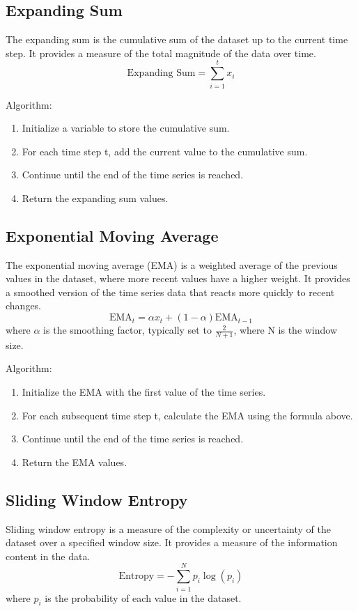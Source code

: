 \subsection{Expanding Sum}
The expanding sum is the cumulative sum of the dataset up to the current time step. It provides a measure of the total magnitude of the data over time.
\begin{equation}
    \text{Expanding Sum} = \sum_{i=1}^{t} x_i
    \label{eq:expanding_sum}
\end{equation}

Algorithm:
\begin{enumerate}
    \item Initialize a variable to store the cumulative sum.
    \item For each time step t, add the current value to the cumulative sum.
    \item Continue until the end of the time series is reached.
    \item Return the expanding sum values.
\end{enumerate}

\subsection{Exponential Moving Average}
The exponential moving average (EMA) is a weighted average of the previous values in the dataset, where more recent values have a higher weight. It provides a smoothed version of the time series data that reacts more quickly to recent changes.
\begin{equation}
    \text{EMA}_t = \alpha x_t + (1 - \alpha) \text{EMA}_{t-1}
    \label{eq:ema}
\end{equation}
where $\alpha$ is the smoothing factor, typically set to $\frac{2}{N+1}$, where N is the window size.

Algorithm:
\begin{enumerate}
    \item Initialize the EMA with the first value of the time series.
    \item For each subsequent time step t, calculate the EMA using the formula above.
    \item Continue until the end of the time series is reached.
    \item Return the EMA values.
\end{enumerate}

\subsection{Sliding Window Entropy}
Sliding window entropy is a measure of the complexity or uncertainty of the dataset over a specified window size. It provides a measure of the information content in the data.
\begin{equation}
    \text{Entropy} = -\sum_{i=1}^{N} p_i \log(p_i)
    \label{eq:entropy}
\end{equation}
where $p_i$ is the probability of each value in the dataset.

